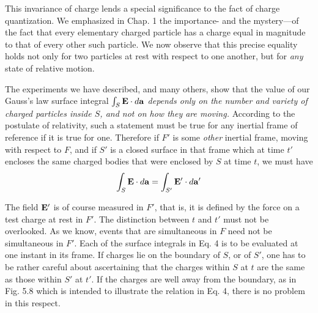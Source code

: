 
This invariance of charge lends a special significance to the fact of
charge quantization. We emphasized in Chap. 1 the importance-
and the mystery---of the fact that every elementary charged particle
has a charge equal in magnitude to that of every other such particle.
We now observe that this precise equality holds not only for two
particles at rest with respect to one another, but for \emph{any} state of relative
motion.

The experiments we have described, and many others, show that
the value of our 
Gauss's law surface integral $\int_S\mathbf{E}\cdot d\mathbf{a}$ \emph{depends only on
the number and variety of charged particles inside $S$, and not on how
they are moving.} According to the postulate of relativity, such a
statement must be true for any inertial frame of reference if it is true
for one. Therefore if $F'$ is some \emph{other} inertial frame, moving with
respect to $F$, and if $S'$ is a closed surface in that frame which at time $t'$
encloses the same charged bodies that were enclosed by $S$ at time $t$,
we must have
\begin{equation}
  \int_S\mathbf{E}\cdot d\mathbf{a} = \int_{S'}\mathbf{E}'\cdot d\mathbf{a}'
\end{equation}

The field $\mathbf{E}'$ is of course measured in $F'$, that is, it is defined by the
force on a test charge at rest in $F'$. The distinction between $t$ and $t'$
must not be overlooked. As we know, events that are simultaneous
in $F$ need not be simultaneous in $F'$. Each of the surface integrals in
Eq. 4 is to be evaluated at one instant in its frame. If charges lie on
the boundary of $S$, or of $S'$, one has to be rather careful about ascertaining
that the charges within $S$ at $t$ are the same as those within $S'$
at $t'$. If the charges are well away from the boundary, as in Fig. 5.8
which is intended to illustrate the relation in Eq. 4, there is no problem
in this respect.

